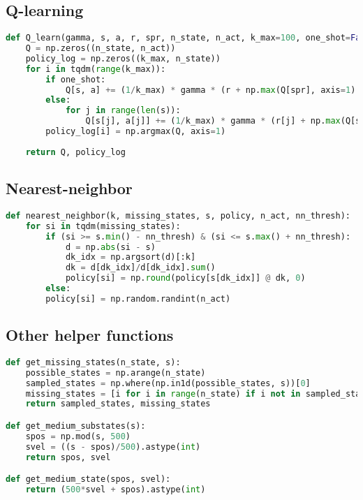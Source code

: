\documentclass[twoside,11pt]{article}
\begin{document}
\subsection{Q-learning}
\begin{algorithm}
    \begin{lstlisting}[language=Python]
def Q_learn(gamma, s, a, r, spr, n_state, n_act, k_max=100, one_shot=False):
    Q = np.zeros((n_state, n_act))
    policy_log = np.zeros((k_max, n_state))
    for i in tqdm(range(k_max)):
        if one_shot:
            Q[s, a] += (1/k_max) * gamma * (r + np.max(Q[spr], axis=1) - Q[s, a])
        else:
            for j in range(len(s)):
                Q[s[j], a[j]] += (1/k_max) * gamma * (r[j] + np.max(Q[spr[j]]) - Q[s[j], a[j]])
        policy_log[i] = np.argmax(Q, axis=1)
    
    return Q, policy_log
    \end{lstlisting}
\end{algorithm}

\subsection{Nearest-neighbor}
\begin{algorithm}
    \begin{lstlisting}[language=Python]
def nearest_neighbor(k, missing_states, s, policy, n_act, nn_thresh):
    for si in tqdm(missing_states):
        if (si >= s.min() - nn_thresh) & (si <= s.max() + nn_thresh):
            d = np.abs(si - s)
            dk_idx = np.argsort(d)[:k]            
            dk = d[dk_idx]/d[dk_idx].sum()
            policy[si] = np.round(policy[s[dk_idx]] @ dk, 0)
        else:
        policy[si] = np.random.randint(n_act) 
    \end{lstlisting}
\end{algorithm}

\subsection{Other helper functions}
\begin{algorithm}
    \begin{lstlisting}[language=Python]
def get_missing_states(n_state, s):
    possible_states = np.arange(n_state)
    sampled_states = np.where(np.in1d(possible_states, s))[0]
    missing_states = [i for i in range(n_state) if i not in sampled_states]
    return sampled_states, missing_states

def get_medium_substates(s):
    spos = np.mod(s, 500)
    svel = ((s - spos)/500).astype(int)
    return spos, svel

def get_medium_state(spos, svel):
    return (500*svel + spos).astype(int)  
    \end{lstlisting}
\end{algorithm}
\end{document}
